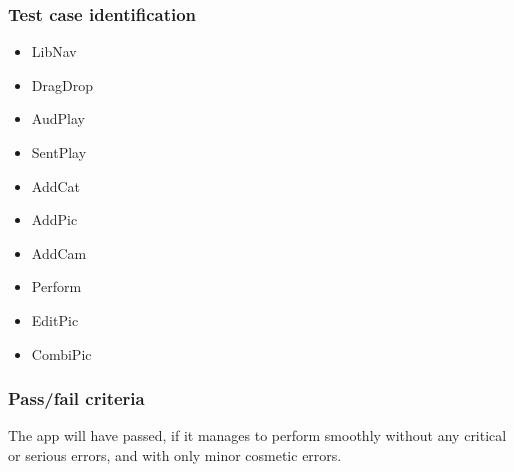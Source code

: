 \subsubsection*{Test case identification}
\begin{itemize}
	\item LibNav
	\item DragDrop
	\item AudPlay
	\item SentPlay
	\item AddCat
	\item AddPic
	\item AddCam
	\item Perform
	\item EditPic
	\item CombiPic
\end{itemize}

\subsubsection*{Pass/fail criteria}
The app will have passed, if it manages to perform smoothly without any critical or serious errors, and with only minor cosmetic errors.


